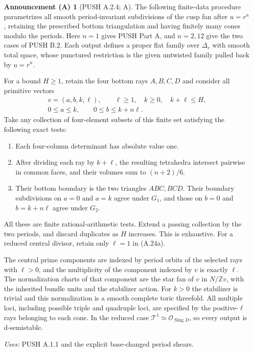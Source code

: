 \documentclass[11pt,a4paper]{article}
\theoremstyle{plain}
\theoremstyle{definition}
\newtheorem{announcement}[theorem]{Announcement (A)}
\begin{document}
\begin{announcement}[PUSH A.2.4; A]\label{push:A.2.4}
The following finite-data procedure parametrizes all smooth
period-invariant subdivisions of the cusp fan after
$u=r^n$, retaining the prescribed bottom triangulation and
having finitely many cones modulo the periods. Here $n=1$
gives PUSH Part A, and $n=2,12$ give the two cases of PUSH B.2.
Each output defines a proper flat family over $\Delta_r$
with smooth total space, whose punctured restriction is the
given untwisted family pulled back by $u=r^n$.

For a bound $H\geq1$, retain the four bottom rays
$A,B,C,D$ and consider all primitive vectors
\[
 \begin{gathered}
 v=(a,b,k,\ell),\qquad
 \ell\geq1,\quad k\geq0,\quad k+\ell\leq H,\\
 0\leq a\leq k,\qquad0\leq b\leq k+n\ell.
 \end{gathered}
 \tag{A.24a}
\]
Take any collection of four-element subsets of this finite
set satisfying the following exact tests:
\begin{enumerate}
\item Each four-column determinant has absolute value one.
\item After dividing each ray by $k+\ell$, the resulting
tetrahedra intersect pairwise in common faces, and their
volumes sum to $(n+2)/6$.
\item Their bottom boundary is the two triangles $ABC,BCD$.
Their boundary subdivisions on $a=0$ and $a=k$ agree under
$G_1$, and those on $b=0$ and $b=k+n\ell$ agree under $G_2$.
\end{enumerate}
All these are finite rational-arithmetic tests. Extend a
passing collection by the two periods, and discard duplicates
as $H$ increases. This is exhaustive. For a reduced central
divisor, retain only $\ell=1$ in (A.24a).

The central prime components are indexed by period orbits of
the selected rays with $\ell>0$, and the multiplicity of the
component indexed by $v$ is exactly $\ell$. The normalization
charts of that component are the star fan of $v$ in
$N/\mathbb Zv$, with the inherited bundle units and the
stabilizer action. For $k>0$ the stabilizer is trivial and this
normalization is a smooth complete toric threefold. All
multiple loci, including possible triple and quadruple loci,
are specified by the positive-$\ell$ rays belonging to each
cone. In the reduced case
$\mathcal T^1\simeq\mathcal O_{\operatorname{Sing}D}$,
so every output is d-semistable.
\end{announcement}
\noindent\emph{Uses:} PUSH A.1.1 and the explicit base-changed period shears.\par
\end{document}

